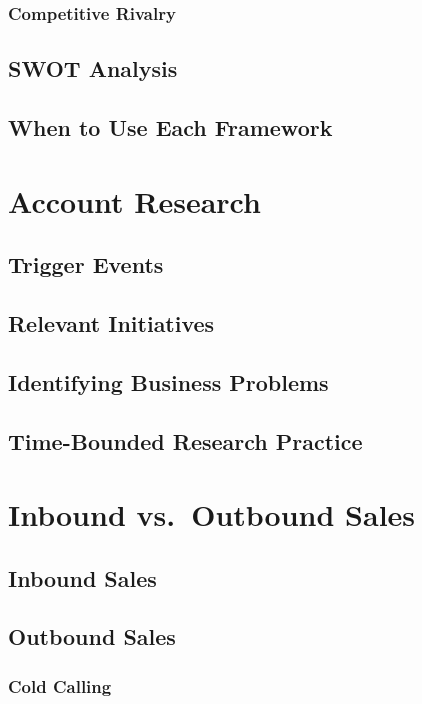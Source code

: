         \subsubsection{Competitive Rivalry}\mbox{}
    \subsection{SWOT Analysis}\mbox{}
    \subsection{When to Use Each Framework}\mbox{}

\section{Account Research}\mbox{}
    \subsection{Trigger Events}\mbox{}
    \subsection{Relevant Initiatives}\mbox{}
    \subsection{Identifying Business Problems}\mbox{}
    \subsection{Time-Bounded Research Practice}\mbox{}

\section{Inbound vs.\ Outbound Sales}\mbox{}
    \subsection{Inbound Sales}\mbox{}
    \subsection{Outbound Sales}\mbox{}
        \subsubsection{Cold Calling}\mbox{}
